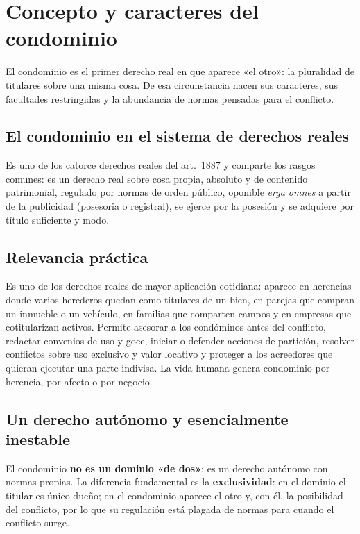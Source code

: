 \documentclass[12pt,oneside]{book}
\begin{document}
\chapter[Concepto y caracteres del condominio]{Concepto y caracteres del condominio}\label{cap:condominio}

El condominio es el primer derecho real en que aparece «el otro»: la pluralidad de titulares sobre una misma cosa. De esa circunstancia nacen sus caracteres, sus facultades restringidas y la abundancia de normas pensadas para el conflicto.

\section{El condominio en el sistema de derechos reales}

Es uno de los catorce derechos reales del art.~1887 y comparte los rasgos comunes: es un derecho real sobre cosa propia, absoluto y de contenido patrimonial, regulado por normas de orden público, oponible \textit{erga omnes} a partir de la publicidad (posesoria o registral), se ejerce por la posesión y se adquiere por título suficiente y modo.

\section{Relevancia práctica}

Es uno de los derechos reales de mayor aplicación cotidiana: aparece en herencias donde varios herederos quedan como titulares de un bien, en parejas que compran un inmueble o un vehículo, en familias que comparten campos y en empresas que cotitularizan activos. Permite asesorar a los condóminos antes del conflicto, redactar convenios de uso y goce, iniciar o defender acciones de partición, resolver conflictos sobre uso exclusivo y valor locativo y proteger a los acreedores que quieran ejecutar una parte indivisa. La vida humana genera condominio por herencia, por afecto o por negocio.

\section{Un derecho autónomo y esencialmente inestable}

El condominio \textbf{no es un dominio «de dos»}: es un derecho autónomo con normas propias. La diferencia fundamental es la \textbf{exclusividad}: en el dominio el titular es único dueño; en el condominio aparece el otro y, con él, la posibilidad del conflicto, por lo que su regulación está plagada de normas para cuando el conflicto surge.
\end{document}
